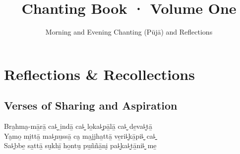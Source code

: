 \documentclass[
  babelLanguage=english,
  final,
  webversion,
]{chantingbook}
\title{Chanting Book · Volume One}
\subtitle{Morning and Evening Chanting (Pūjā) and Reflections}
\begin{document}
\mainmatter


\part{Reflections \& Recollections}


\chapter*[Sharing and Aspiration]{Verses of Sharing and Aspiration}




Bra̱hma̮-mā̱rā̱ ca꜕̮ i̱ndā̱ ca꜕̮ lo̱ka꜕̮pā̱lā̱ ca꜕̮ de̱va꜕̮tā̱\\
Ya̮mo̱ mi̱ttā̱ ma꜕̮nu̱ssā̱ ca̮ ma̱jjha̱ttā̱ ve̱ri꜕̮kā̱pi꜕̮ ca꜕̱\\
Sa꜕̱bbe̱ sa̱ttā̱ su̮khī̱ ho̱ntu̮ pu̱ññā̱ni̮ pa꜕̮ka꜕̮tā̱ni꜕̮ me̱

\end{document}
